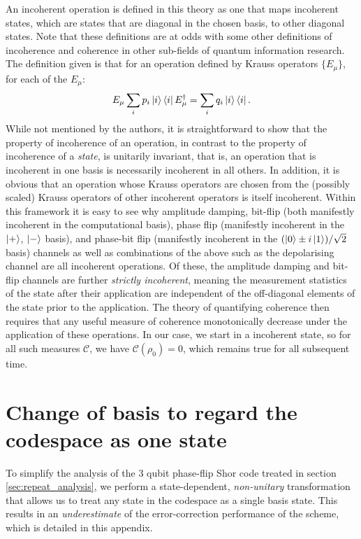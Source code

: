 \documentclass{report}
\begin{document}
\begin{appendices}
An incoherent operation is defined in this theory as one that maps incoherent states, which are states that are diagonal in the chosen basis, to other diagonal states. Note that these definitions are at odds with some other definitions of incoherence and coherence in other sub-fields of quantum information research. The definition given is that for an operation defined by Krauss operators $\{E_\mu\}$, for each of the $E_\mu$:
\begin{equation*}
    E_\mu \sum_i p_i \ket{i}\bra{i} E_\mu^\dag = \sum_i q_i \ket{i}\bra{i}.
\end{equation*}
While not mentioned by the authors, it is straightforward to show that the property of incoherence of an operation, in contrast to the property of incoherence of a \textit{state}, is unitarily invariant, that is, an operation that is incoherent in one basis is necessarily incoherent in all others. In addition, it is obvious that an operation whose Krauss operators are chosen from the (possibly scaled) Krauss operators of other incoherent operators is itself incoherent. Within this framework it is easy to see why amplitude damping, bit-flip (both manifestly incoherent in the computational basis), phase flip (manifestly incoherent in the $\ket{+}$, $\ket{-}$ basis), and phase-bit flip (manifestly incoherent in the $(\ket{0} \pm i\ket{1})/\sqrt{2}$ basis) channels as well as combinations of the above such as the depolarising channel are all incoherent operations. Of these, the amplitude damping and bit-flip channels are further \textit{strictly incoherent}, meaning the measurement statistics of the state after their application are independent of the off-diagonal elements of the state prior to the application. The theory of quantifying coherence then requires that any useful measure of coherence monotonically decrease under the application of these operations. In our case, we start in a incoherent state, so for all such measures $\mathcal{C}$, we have $\mathcal{C}(\rho_0) = 0$, which remains true for all subsequent time.

\chapter{Change of basis to regard the codespace as one state}\label{appendix:changeofbasis}
To simplify the analysis of the 3 qubit phase-flip Shor code treated in section \ref{sec:repeat_analysis}, we perform a state-dependent, \textit{non-unitary} transformation that allows us to treat any state in the codespace as a single basis state. This results in an \textit{underestimate} of the error-correction performance of the scheme, which is detailed in this appendix.


\end{appendices}
\end{document}
